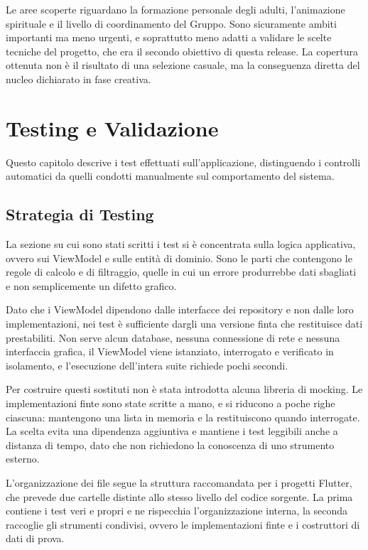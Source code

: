 \documentclass[11pt]{article}
\numberwithin{figure}{section}
\begin{document}
Le aree scoperte riguardano la formazione personale degli adulti, l'animazione spirituale e il livello di coordinamento del Gruppo. Sono sicuramente ambiti importanti ma meno urgenti, e soprattutto meno adatti a validare le scelte tecniche del progetto, che era il secondo obiettivo di questa release. La copertura ottenuta non è il risultato di una selezione casuale, ma la conseguenza diretta del nucleo dichiarato in fase creativa.

\section{Testing e Validazione}

Questo capitolo descrive i test effettuati sull'applicazione, distinguendo i controlli automatici da quelli condotti manualmente sul comportamento del sistema.

\subsection{Strategia di Testing}

La sezione su cui sono stati scritti i test si è concentrata sulla logica applicativa, ovvero sui ViewModel e sulle entità di dominio. Sono le parti che contengono le regole di calcolo e di filtraggio, quelle in cui un errore produrrebbe dati sbagliati e non semplicemente un difetto grafico.

Dato che i ViewModel dipendono dalle interfacce dei repository e non dalle loro implementazioni, nei test è sufficiente dargli una versione finta che restituisce dati prestabiliti. Non serve alcun database, nessuna connessione di rete e nessuna interfaccia grafica, il ViewModel viene istanziato, interrogato e verificato in isolamento, e l'esecuzione dell'intera suite richiede pochi secondi.

Per costruire questi sostituti non è stata introdotta alcuna libreria di mocking. Le implementazioni finte sono state scritte a mano, e si riducono a poche righe ciascuna: mantengono una lista in memoria e la restituiscono quando interrogate. La scelta evita una dipendenza aggiuntiva e mantiene i test leggibili anche a distanza di tempo, dato che non richiedono la conoscenza di uno strumento esterno.

L'organizzazione dei file segue la struttura raccomandata per i progetti Flutter, che prevede due cartelle distinte allo stesso livello del codice sorgente. La prima contiene i test veri e propri e ne rispecchia l'organizzazione interna, la seconda raccoglie gli strumenti condivisi, ovvero le implementazioni finte e i costruttori di dati di prova.
\end{document}
